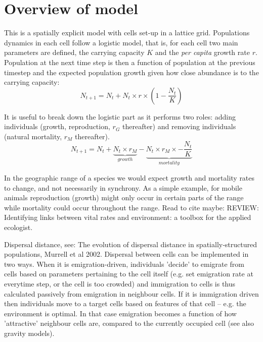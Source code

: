 \documentclass{article}
\begin{document}
\section{Overview of model}

This is a spatially explicit model with cells set-up in a lattice
grid. Populations dynamics in each cell follow a logistic model, that
is, for each cell two main parameters are defined, the carrying
capacity $K$ and the \emph{per capita} growth rate $r$. Population at
the next time step is then a function of population at the previous
timestep and the expected population growth given how close abundance
is to the carrying capacity:
\begin{equation}
N_{t+1} = N_t + N_t \times r \times (1-\frac{N_t}{K})
\end{equation}

It is useful to break down the logistic part as it performs two roles:
adding individuals (growth, reproduction, $r_G$ thereafter) and removing individuals
(natural mortality, $r_M$ thereafter).
\begin{equation}
\displaystyle N_{t+1}=N_t + \underbrace{N_t \times
  r_M}_{\textstyle{growth}} -
\underbrace{N_t \times r_M \times-\displaystyle\frac{N_t}{K}}_{\textstyle{mortality}}
\end{equation}

In the geographic range of a species we would expect growth and
mortality rates to change, and not necessarily in synchrony. As a
simple example, for mobile animals reproduction (growth) might only
occur in certain parts of the range while mortality could occur
throughout the range.
Read to cite maybe: REVIEW: Identifying links between vital rates and
environment: a toolbox for the applied ecologist.

Dispersal distance, see: The evolution of dispersal distance in
spatially‐structured populations, Murrell et al 2002.
Dispersal between cells can be implemented in two ways. When it is
emigration-driven, individuals 'decide' to emigrate from cells based
on parameters pertaining to the cell itself (e.g. set emigration
rate at everytime step, or the cell is too crowded) and immigration to
cells is thus calculated passively from emigration in neighbour
cells. If it is immigration driven then individuals move to a target
cells based on features of that cell -- e.g. the environment is
optimal. In that case emigration becomes a function of how
'attractive' neighbour cells are, compared to the currently occupied
cell (see also gravity models).\\
\end{document}

